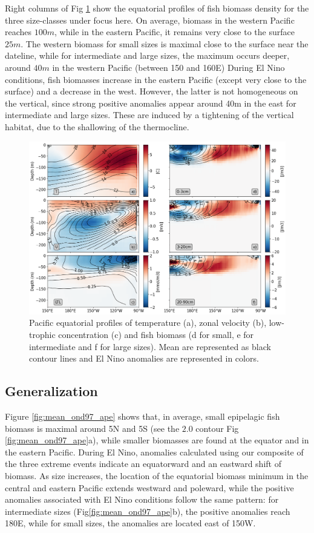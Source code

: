 Right columns of Fig \ref{fig:profiles} show the equatorial profiles of fish biomass density for the three size-classes under focus here. On average, biomass in the western Pacific reaches $100m$, while in the eastern Pacific, it remains very close to the surface $25m$. The western biomass for small sizes is maximal close to the surface near the dateline, while for intermediate and large sizes, the maximum occurs deeper, around $40m$ in the western Pacific (between 150 and 160\degree{}E)
During El Nino conditions, fish biomasses increase in the eastern Pacific (except very close to the surface) and a decrease in the west. However, the latter is not homogeneous on the vertical, since strong positive anomalies appear around 40m in the east for intermediate and large sizes. These are induced by a tightening of the vertical habitat, due to the shallowing of the thermocline.

\begin{figure}[h!tp]
	\centering
	\includegraphics[scale=0.4]{figs/forage_mean_ond97.png}	
	\caption{Pacific equatorial profiles of temperature (a), zonal velocity (b), low-trophic concentration (c) and fish biomass (d for small, e for intermediate and f for large sizes). Mean are represented as black contour lines and El Nino anomalies are represented in colors.}	
	\label{fig:profiles}
\end{figure}

\subsection{Generalization}

Figure \ref{fig:mean_ond97_ape} shows that, in average, small epipelagic fish biomass is maximal around 5\degree{}N and 5\degree{}S (see the $2.0$ contour Fig \ref{fig:mean_ond97_ape}a), while smaller biomasses are found at the equator and in the eastern Pacific. During El Nino, anomalies calculated using our composite of the three extreme events indicate an equatorward and an eastward shift of biomass.
As size increases, the location of the equatorial biomass minimum in the central and eastern Pacific extends westward and poleward, while the positive anomalies associated with El Nino conditions follow the same pattern: for intermediate sizes (Fig\ref{fig:mean_ond97_ape}b), the positive anomalies reach 180\degree{}E, while for small sizes, the anomalies are located east of 150\degree{}W. 

